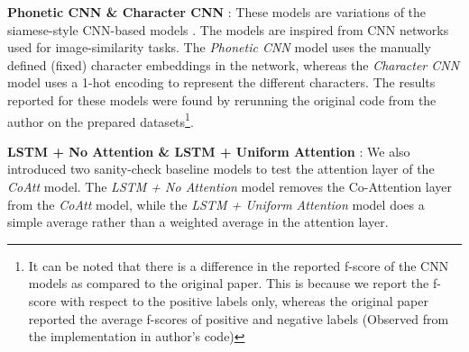 \documentclass[11pt,letterpaper]{article}
\begin{document}
\textbf{Phonetic CNN \& Character CNN} : These models are variations of the siamese-style CNN-based models \cite{rama2016siamese}. The models are inspired from CNN networks used for image-similarity tasks. The \textit{Phonetic CNN} model uses the manually defined (fixed) character embeddings in the network, whereas the \textit{Character CNN} model uses a 1-hot encoding to represent the different characters. The results reported for these models were found by rerunning the original code from the  author on the prepared datasets\footnote{It can be noted that there is a difference in the reported f-score of the CNN models as compared to the original paper. This is because we report the f-score with respect to the positive labels only, whereas the original paper reported the average f-scores of positive and negative labels (Observed from the implementation in author's code)}.

\textbf{LSTM + No Attention \& LSTM + Uniform Attention} : We also introduced two sanity-check baseline models to test the attention layer of the \textit{CoAtt} model. The \textit{LSTM + No Attention} model removes the Co-Attention layer from the \textit{CoAtt} model, while the \textit{LSTM + Uniform Attention} model does a simple average rather than a weighted average in the attention layer.
\end{document}
